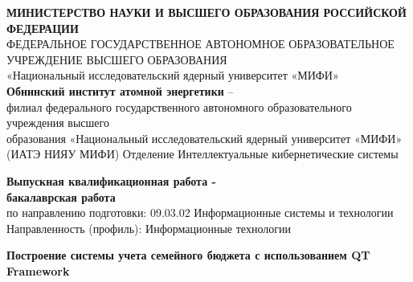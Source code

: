\documentclass[a4paper,12pt]{article}
\begin{document}

\renewcommand{\refname}{СПИСОК ИСПОЛЬЗОВАННОЙ ЛИТЕРАТУРЫ} 
\renewcommand{\contentsname}{СОДЕРЖАНИЕ} 

\thispagestyle{empty}
\begin{center} \small
 
\textbf{МИНИСТЕРСТВО НАУКИ И ВЫСШЕГО ОБРАЗОВАНИЯ РОССИЙСКОЙ ФЕДЕРАЦИИ}\\
ФЕДЕРАЛЬНОЕ ГОСУДАРСТВЕННОЕ АВТОНОМНОЕ ОБРАЗОВАТЕЛЬНОЕ УЧРЕЖДЕНИЕ ВЫСШЕГО ОБРАЗОВАНИЯ\\
«Национальный исследовательский ядерный университет «МИФИ»\\
\textbf{Обнинский институт атомной энергетики} – \\
филиал федерального государственного автономного образовательного учреждения высшего\\
образования «Национальный исследовательский ядерный университет «МИФИ»\\
(ИАТЭ НИЯУ МИФИ)
Отделение Интеллектуальные кибернетические системы
\end{center}

\begin{center}
\textbf{\Large Выпускная квалификационная работа -\\ бакалаврская работа} \\
	по направлению подготовки: 09.03.02 Информационные системы и технологии\\	
	Направленность (профиль): Информационные технологии
	\medskip
	
	\textbf{\Large 
		Построение системы учета семейного бюджета с использованием QT Framework
	}
	
\end{center}

\vspace{1cm}
\end{document}
